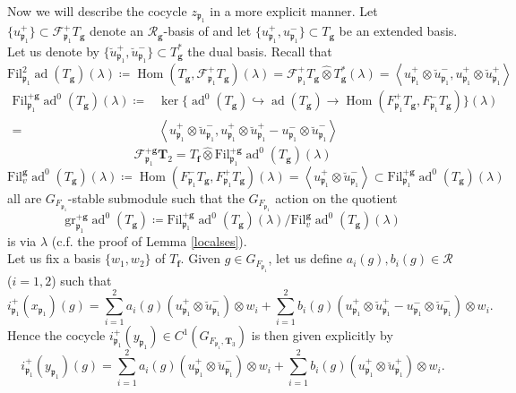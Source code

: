 \documentclass[10pt]{amsart}
\numberwithin{equation}{section}
\theoremstyle{definition}
\theoremstyle{remark} %
\newcommand{\ad}{\operatorname{ad}}
\newcommand{\Fil}{\mathrm{Fil}}
\newcommand{\Hom}{\operatorname{Hom}}
\newcommand{\f}{\mathbf{f}}
\newcommand{\scrF}{\mathscr{F}}
\newcommand{\g}{\mathbf{g}}
\newcommand{\p}{\mathfrak{p}}
\newcommand{\R}{\mathcal{R}}
\newcommand{\T}{\mathbf{T}}
\newcommand{\uu}{\breve{u}}
\begin{document}
		\subsubsection{}
		Now we will describe the cocycle $ z_{\p_1} $ in a more explicit manner.
		Let $\{ u^+_{\p_1} \} \subset \scrF^+_{\p_1} T_\g$ denote an $\R_\g$-basis of and let $\{ u^+_{\p_1} , u^-_{\p_1}  \} \subset  T_\g $ be an extended basis. Let us denote by $ \{ \breve{u}^+_{\p_1} , \breve{u}^-_{\p_1}  \} \subset  T_\g^*  $ the dual basis. Recall that 
		$$ \mathrm{Fil}^2_{\p_1}\ad(T_\g)(\lambda) \coloneqq \Hom(T_\g,\scrF^{+}_{\p_1} T_\g)(\lambda) = \scrF^{+}_{\p_1} T_\g \widehat{\otimes} T_\g^* (\lambda) =\left\langle u^+_{\p_1} \otimes \breve{u}^-_{\p_1}, u^+_{\p_1} \otimes \uu^+_{\p_1} \right\rangle $$
		\begin{equation*}
			\begin{split}
				\mathrm{Fil}^{+\g}_{\p_1} \ad^0(T_\g)(\lambda) \coloneqq & \ker \{\ad^0(T_\g) \hookrightarrow \ad(T_\g) \rightarrow \Hom(F_{\p_1}^+ T_\g,F_{\p_1}^- T_\g) \}(\lambda) \\
				= & \left\langle u^+_{\p_1} \otimes \breve{u}^-_{\p_1}, u^+_{\p_1} \otimes \uu^+_{\p_1}  - u^-_{\p_1} \otimes \uu^-_{\p_1} \right\rangle
			\end{split}
		\end{equation*}
		$$ \scrF^{+\g}_{\p_1} \T_{2} = T_\f \widehat{\otimes} \Fil^{+\g}_{\p_1} \ad^0(T_\g)(\lambda)  $$
		$$ \Fil^{\g}_{v}\ad^0(T_\g)(\lambda) \coloneqq \Hom(F_{\p_1}^- T_\g,F_{\p_1}^+  T_\g)(\lambda) = \left\langle u^+_{\p_1} \otimes \breve{u}^-_{\p_1} \right\rangle \subset 	\mathrm{Fil}^{+\g}_{\p_1} \ad^0(T_\g)(\lambda) $$
		all are $G_{F_{\p_1}}$-stable submodule such that the $G_{F_{\p_1}}$ action on the quotient  
		$$ \mathrm{gr}^{+\g}_{\p_1} \ad^0(T_\g) \coloneqq \mathrm{Fil}^{+\g}_{\p_1} \ad^0(T_\g)(\lambda) / \Fil^{\g}_{v}\ad^0(T_\g)(\lambda) $$
		is via $\lambda$ (c.f. the proof of Lemma \ref{localses}). \\
		Let us fix a basis $\{ w_1,w_2 \}$ of $T_\f$. Given $g \in G_{F_{\p_1}}$, let us define $a_i(g), b_i(g)  \in \R$ ($i = 1,2$) such that 
		$$ i_{\p_1}^+(x_{\p_1})(g) = \sum_{i=1}^{2} a_i(g)(u^+_{\p_1} \otimes \breve{u}^-_{\p_1})\otimes w_i + \sum_{i=1}^{2} b_i(g)( u^+_{\p_1} \otimes \uu^+_{\p_1}  - u^-_{\p_1} \otimes \uu^-_{\p_1})\otimes w_i . $$
		Hence the cocycle $i_{\p_1}^+(y_{\p_1}) \in C^1(G_{F_{\p_1},\T_{3}}) $ is then given explicitly by  
		$$ i_{\p_1}^+(y_{\p_1})(g) = \sum_{i=1}^{2} a_i(g)(u^+_{\p_1} \otimes \breve{u}^-_{\p_1})\otimes w_i + \sum_{i=1}^{2} b_i(g)( u^+_{\p_1} \otimes \uu^+_{\p_1} )\otimes w_i . $$
\end{document}
